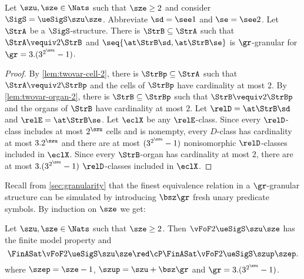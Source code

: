 

\begin{remark}\label{rem:twovar-granular}
Let $\szu, \sze \in \Nats$ such that $\sze \geq 2$ and consider
$\SigS = \ueSigS\szu\sze$.
Abbreviate $\sd = \see1$ and $\se = \see2$.
Let $\StrA$ be a $\SigS$-structure.
There is $\StrB \subseteq \StrA$ such that
$\StrA \vequiv2 \StrB$ and $\seq{\at\StrB\sd,\at\StrB\se}$ is $\gr$-granular
for $\gr = 3.(3^{2^\szu}-1)$.
\end{remark}
\begin{proof}
By \cref{lem:twovar-cell-2}, there is $\StrBp \subseteq \StrA$ such that
$\StrA \vequiv2 \StrBp$ and the cells of $\StrBp$ have cardinality at most $2$.
By \cref{lem:twovar-organ-2}, there is $\StrB \subseteq \StrBp$ such that
$\StrB \vequiv2 \StrBp$ and the organs of $\StrB$ have cardinality at most $2$.
Let $\relD = \at\StrB\sd$ and $\relE = \at\StrB\se$.
Let $\eclX$ be any $\relE$-class.
Since every $\relD$-class includes at most $2^\szu$ cells and is nonempty, every
$D$-class has cardinality at most $3.2^\szu$ and there are at most
$(3^{2^\szu}-1)$ nonisomorphic $\relD$-classes included in $\eclX$.
Since every $\StrB$-organ has cardinality at most $2$, there are at most
$3.(3^{2^\szu}-1)$ $\relD$-classes included in $\eclX$.
\end{proof}
Recall from \cref{sec:granularity} that the finest equivalence relation in a
$\gr$-granular structure can be simulated by introducing $\bsz\gr$ fresh unary
predicate symbols.
By induction on $\sze$ we get:
\begin{corollary}\label{cor:twovar-sub-1}
Let $\szu,\sze \in \Nats$ such that $\sze \geq 2$.
Then $\vFoF2{\ueSigS\szu\sze}$ has the finite model property and
\[
  \FinASat\vFoF2{\ueSigS\szu\sze} \red\cP
  \FinASat\vFoF2{\ueSigS\szup\szep}.
\]
where $\szep = \sze - 1$, $\szup = \szu + \bsz\gr$ and
$\gr = 3.(3^{2^\szu} - 1)$.
\end{corollary}


